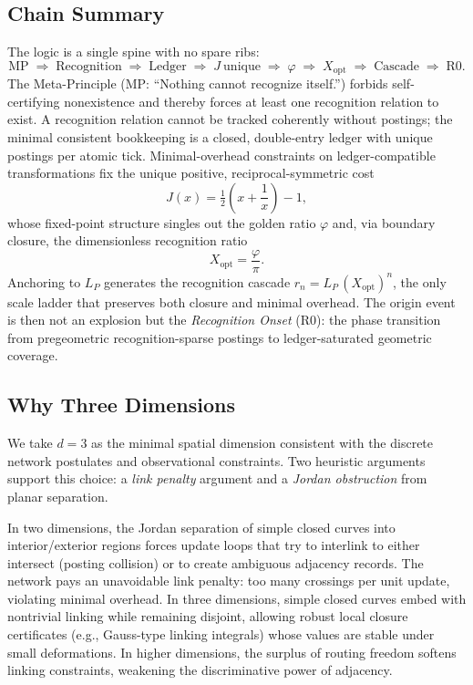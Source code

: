 \documentclass[11pt]{article}
\theoremstyle{definition}
\theoremstyle{remark}
\begin{document}
\subsection{Chain Summary}
The logic is a single spine with no spare ribs:
\[
\text{MP} \;\Rightarrow\; \text{Recognition} \;\Rightarrow\; \text{Ledger} \;\Rightarrow\; J\ \text{unique} \;\Rightarrow\; \varphi \;\Rightarrow\; X_{\mathrm{opt}} \;\Rightarrow\; \text{Cascade} \;\Rightarrow\; \text{R0}.
\]
The Meta-Principle (MP: “Nothing cannot recognize itself.”) forbids self-certifying nonexistence and thereby forces at least one recognition relation to exist. A recognition relation cannot be tracked coherently without postings; the minimal consistent bookkeeping is a closed, double-entry ledger with unique postings per atomic tick. Minimal-overhead constraints on ledger-compatible transformations fix the unique positive, reciprocal-symmetric cost
\[
J(x)=\tfrac12\!\left(x+\frac{1}{x}\right)-1,
\]
whose fixed-point structure singles out the golden ratio \(\varphi\) and, via boundary closure, the dimensionless recognition ratio
\[
X_{\mathrm{opt}}=\frac{\varphi}{\pi}.
\]
Anchoring to \(L_P\) generates the recognition cascade \(r_n=L_P\,(X_{\mathrm{opt}})^n\), the only scale ladder that preserves both closure and minimal overhead. The origin event is then not an explosion but the \emph{Recognition Onset} (R0): the phase transition from pregeometric recognition-sparse postings to ledger-saturated geometric coverage.

\subsection{Why Three Dimensions}
We take \(d=3\) as the minimal spatial dimension consistent with the discrete network postulates and observational constraints. Two heuristic arguments support this choice: a \emph{link penalty} argument and a \emph{Jordan obstruction} from planar separation.

In two dimensions, the Jordan separation of simple closed curves into interior/exterior regions forces update loops that try to interlink to either intersect (posting collision) or to create ambiguous adjacency records. The network pays an unavoidable link penalty: too many crossings per unit update, violating minimal overhead. In three dimensions, simple closed curves embed with nontrivial linking while remaining disjoint, allowing robust local closure certificates (e.g., Gauss-type linking integrals) whose values are stable under small deformations. In higher dimensions, the surplus of routing freedom softens linking constraints, weakening the discriminative power of adjacency.
\end{document}
